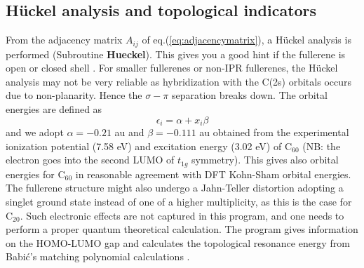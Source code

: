 \documentclass[article,a4paper,twoside]{memoir}
\newcommand{\C}[1]{\ensuremath{\mathrm{C}_{#1}}}
\newcommand{\funname}[1]{{\color{blue}\textbf{#1}}}
\begin{document}
\subsection{H\"uckel analysis and topological indicators}
From the adjacency matrix $A_{ij}$ of eq.(\ref{eq:adjacencymatrix}), a H\"uckel analysis is performed (Subroutine \funname{Hueckel}). This gives you a good hint if the 
fullerene is open or closed shell \cite{Atlas}. For smaller fullerenes or non-IPR fullerenes, the H\"uckel analysis may not be very reliable 
as hybridization with the C(2s) orbitals occurs due to non-planarity. Hence the $\sigma-\pi$ separation breaks down. The orbital energies are defined as
\begin{equation}
  \label{Hueckel}
  \epsilon_i=\alpha+x_i\beta
\end{equation}
and we adopt $\alpha = -0.21$ au  and  $\beta = -0.111$ au obtained
from the experimental ionization potential (7.58 eV) and excitation energy (3.02 eV) of \C{60} (NB: the electron goes 
into the second LUMO of $t_{1g}$ symmetry). This gives also orbital energies for \C{60} in reasonable 
agreement with DFT Kohn-Sham orbital energies. The fullerene structure might also undergo a Jahn-Teller distortion adopting a singlet 
ground state instead of one of a higher multiplicity, as this is the case for \C{20}. Such electronic effects are not
captured in this program, and one needs to perform a proper quantum theoretical calculation. The program gives information
on the HOMO-LUMO gap and calculates the topological resonance energy from Babi\'c's matching polynomial calculations \cite{Babic1995,Babic1997}.
\end{document}
